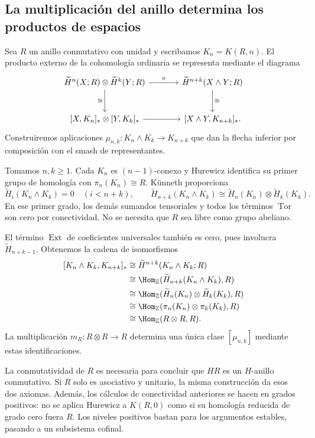 \subsection{La multiplicación del anillo determina los productos de espacios}
Sea $R$ un anillo conmutativo con unidad y escribamos $K_n=K(R,n)$. El producto externo de la cohomología ordinaria se representa mediante el diagrama
\[
\begin{tikzcd}[column sep=large,row sep=large]
\widetilde H^n(X;R)\otimes\widetilde H^k(Y;R)\arrow[r,"\times"]\arrow[d,"\cong"']&
\widetilde H^{n+k}(X\wedge Y;R)\arrow[d,"\cong"]\\
{[X,K_n]_*}\otimes{[Y,K_k]_*}\arrow[r]&{[X\wedge Y,K_{n+k}]_*}.
\end{tikzcd}
\]
Construiremos aplicaciones $\mu_{n,k}\colon K_n\wedge K_k\to K_{n+k}$ que dan la flecha inferior por composición con el smash de representantes.

Tomamos $n,k\geq1$. Cada $K_n$ es $(n-1)$-conexo y Hurewicz identifica su primer grupo de homología con $\pi_n(K_n)\cong R$. Künneth proporciona
\[
\widetilde H_i(K_n\wedge K_k)=0\quad(i<n+k),
\qquad
\widetilde H_{n+k}(K_n\wedge K_k)
\cong\widetilde H_n(K_n)\otimes\widetilde H_k(K_k).
\]
En ese primer grado, los demás sumandos tensoriales y todos los términos $\operatorname{Tor}$ son cero por conectividad. No se necesita que $R$ sea libre como grupo abeliano.

El término $\operatorname{Ext}$ de coeficientes universales también es cero, pues involucra $\widetilde H_{n+k-1}$. Obtenemos la cadena de isomorfismos
\[
\begin{aligned}
[K_n\wedge K_k,K_{n+k}]_*
&\cong\widetilde H^{n+k}(K_n\wedge K_k;R)\\
&\cong\Hom_{\mathbb Z}(\widetilde H_{n+k}(K_n\wedge K_k),R)\\
&\cong\Hom_{\mathbb Z}(\widetilde H_n(K_n)\otimes\widetilde H_k(K_k),R)\\
&\cong\Hom_{\mathbb Z}(\pi_n(K_n)\otimes\pi_k(K_k),R)\\
&\cong\Hom_{\mathbb Z}(R\otimes R,R).
\end{aligned}
\]
La multiplicación $m_R\colon R\otimes R\to R$ determina una única clase $[\mu_{n,k}]$ mediante estas identificaciones.

\begin{nota}
La conmutatividad de $R$ es necesaria para concluir que $HR$ es un $H$-anillo conmutativo. Si $R$ solo es asociativo y unitario, la misma construcción da esos dos axiomas. Además, los cálculos de conectividad anteriores se hacen en grados positivos: no se aplica Hurewicz a $K(R,0)$ como si su homología reducida de grado cero fuera $R$. Los niveles positivos bastan para los argumentos estables, pasando a un subsistema cofinal.
\end{nota}

